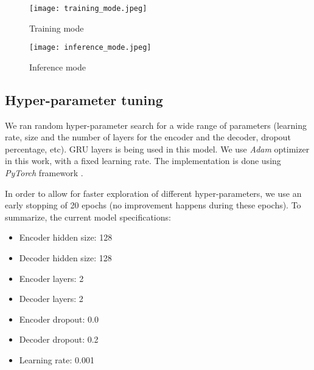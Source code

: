\documentclass[conference]{IEEEtran}
\begin{document}
\begin{figure*}[htbp!]
    \centering
    \begin{subfigure}{1.0\textwidth}
        \centering
        \texttt{[image: training\_mode.jpeg]}
        \caption{Training mode\label{fig:training_mode}}
    \end{subfigure}
    \begin{subfigure}{1.0\textwidth}
        \centering
        \texttt{[image: inference\_mode.jpeg]}
        \caption{Inference mode\label{fig:inf_mode}}
    \end{subfigure}
    \caption{Schematic diagram of the model we used. During the training time \ref{fig:training_mode}, the input to the model is always the ground truth. During the inference time \ref{fig:inf_mode} however, the input to the decoder (generator) part at each time step is its own predication in the previous time step.}
    \label{fig:model_arch}
\end{figure*}

\subsection{Hyper-parameter tuning} \label{hyperparam}
\par We ran random hyper-parameter search for a wide range of parameters (learning rate, size and the number of layers for the encoder and the decoder, dropout percentage, etc). GRU layers \cite{cho2014learning,chung2014empirical} is being used in this model. We use \textit{Adam} \cite{kingma2014adam} optimizer in this work, with a fixed learning rate. The implementation is done using \textit{PyTorch} framework \cite{paszke2017automatic}.

\par In order to allow for faster exploration of different hyper-parameters, we use an early stopping of 20 epochs (no improvement happens during these epochs). To summarize, the current model specifications:
\begin{itemize}
    \item Encoder hidden size: 128
    \item Decoder hidden size: 128
    \item Encoder layers: 2
    \item Decoder layers: 2
    \item Encoder dropout: 0.0
    \item Decoder dropout: 0.2
    \item Learning rate: 0.001
\end{itemize}
\end{document}
